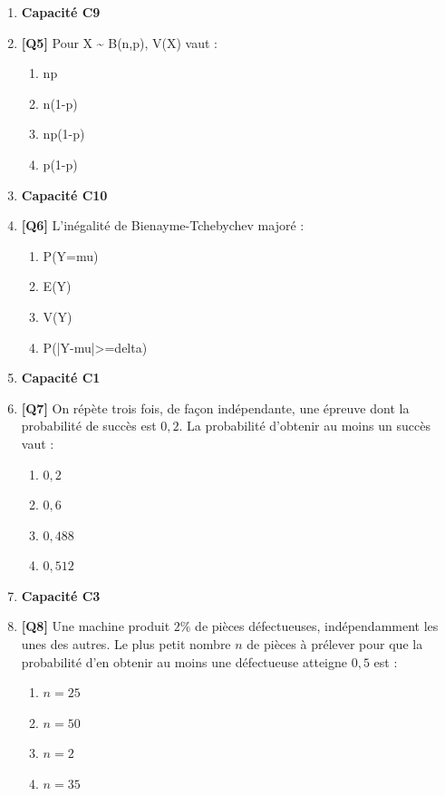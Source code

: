 \begin{enumerate}
\item[] \textbf{Capacité C9}

\item \textbf{[Q5]} Pour X \textasciitilde{} B(n,p), V(X) vaut :
  \begin{enumerate}[label=\Alph*.]
    \item np
    \item n(1-p)
    \item np(1-p)
    \item p(1-p)
  \end{enumerate}

\item[] \textbf{Capacité C10}

\item \textbf{[Q6]} L'inégalité de Bienayme-Tchebychev majoré :
  \begin{enumerate}[label=\Alph*.]
    \item P(Y=mu)
    \item E(Y)
    \item V(Y)
    \item P(|Y-mu|>=delta)
  \end{enumerate}

\item[] \textbf{Capacité C1}

\item \textbf{[Q7]} On répète trois fois, de façon indépendante, une épreuve dont la probabilité de succès est $0{,}2$. La probabilité d'obtenir au moins un succès vaut :
  \begin{enumerate}[label=\Alph*.]
    \item $0{,}2$
    \item $0{,}6$
    \item $0{,}488$
    \item $0{,}512$
  \end{enumerate}

\item[] \textbf{Capacité C3}

\item \textbf{[Q8]} Une machine produit $2\%$ de pièces défectueuses, indépendamment les unes des autres. Le plus petit nombre $n$ de pièces à prélever pour que la probabilité d'en obtenir au moins une défectueuse atteigne $0{,}5$ est :
  \begin{enumerate}[label=\Alph*.]
    \item $n=25$
    \item $n=50$
    \item $n=2$
    \item $n=35$
  \end{enumerate}


\end{enumerate}
